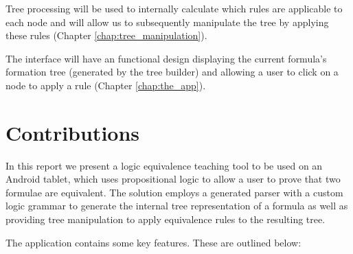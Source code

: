 \documentclass[draft]{report}
\begin{document}
Tree processing will be used to internally calculate which rules are applicable to each node and will allow us to subsequently manipulate the tree by applying these rules (Chapter \ref{chap:tree_manipulation}).

The interface will have an functional design displaying the current formula's formation tree (generated by the tree builder) and allowing a user to click on a node to apply a rule (Chapter \ref{chap:the_app}).

\section{Contributions}
\label{sec:objectives}

In this report we present a logic equivalence teaching tool to be used on an Android tablet, which uses propositional logic to allow a user to prove that two formulae are equivalent. The solution employs a generated parser with a custom logic grammar to generate the internal tree representation of a formula as well as providing tree manipulation to apply equivalence rules to the resulting tree. 

The application contains some key features. These are outlined below:
\end{document}
